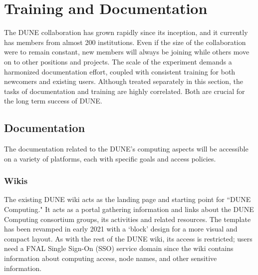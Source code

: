 \documentclass[../main-v1.tex]{subfiles}
\begin{document}
\chapter{Training and Documentation }
\label{ch:train}
The DUNE collaboration has grown rapidly since its inception, and it currently has members from almost 200 institutions.  Even if the size of the collaboration were to remain constant, new members will always be joining while others move on to other positions and projects.  The scale of the experiment demands a harmonized documentation effort, coupled with consistent training for both newcomers and existing users. Although treated separately in this section, the tasks of documentation and training are highly correlated. Both are crucial for the long term success of DUNE. 

\section{Documentation}
The documentation related to the DUNE’s computing aspects will be accessible on a variety of platforms, each with specific goals and access policies.

\subsection{Wikis}
The existing DUNE wiki acts as the landing page and starting point for ``DUNE Computing." It acts as a portal gathering information and links about the DUNE Computing consortium groups, its activities and related resources. The template has been revamped in early 2021 with a ‘block’ design for a more visual and compact layout. As with the rest of the DUNE wiki, its access is restricted; users need a FNAL Single Sign-On (SSO) service domain since the wiki contains information about computing access, node names, and other sensitive information.
\end{document}
